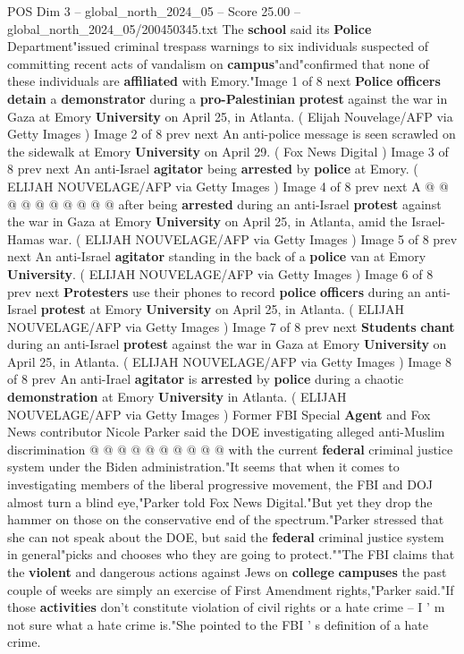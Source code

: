 \begin{textsample}{POS Dim 3 – global\_north\_2024\_05 – Score 25.00 – global\_north\_2024\_05/200450345.txt}
The \textbf{school} said its \textbf{Police} Department"issued criminal trespass warnings to six individuals suspected of committing recent acts of vandalism on \textbf{campus}"and"confirmed that none of these individuals are \textbf{affiliated} with Emory."Image 1 of 8 next \textbf{Police} \textbf{officers} \textbf{detain} a \textbf{demonstrator} during a \textbf{pro-Palestinian} \textbf{protest} against the war in Gaza at Emory \textbf{University} on April 25, in Atlanta. ( Elijah Nouvelage/AFP via Getty Images ) Image 2 of 8 prev next An anti-police message is seen scrawled on the sidewalk at Emory \textbf{University} on April 29. ( Fox News Digital ) Image 3 of 8 prev next An anti-Israel \textbf{agitator} being \textbf{arrested} by \textbf{police} at Emory. ( ELIJAH NOUVELAGE/AFP via Getty Images ) Image 4 of 8 prev next A @ @ @ @ @ @ @ @ @ @ after being \textbf{arrested} during an anti-Israel \textbf{protest} against the war in Gaza at Emory \textbf{University} on April 25, in Atlanta, amid the Israel-Hamas war. ( ELIJAH NOUVELAGE/AFP via Getty Images ) Image 5 of 8 prev next An anti-Israel \textbf{agitator} standing in the back of a \textbf{police} van at Emory \textbf{University}. ( ELIJAH NOUVELAGE/AFP via Getty Images ) Image 6 of 8 prev next \textbf{Protesters} use their phones to record \textbf{police} \textbf{officers} during an anti-Israel \textbf{protest} at Emory \textbf{University} on April 25, in Atlanta. ( ELIJAH NOUVELAGE/AFP via Getty Images ) Image 7 of 8 prev next \textbf{Students} \textbf{chant} during an anti-Israel \textbf{protest} against the war in Gaza at Emory \textbf{University} on April 25, in Atlanta. ( ELIJAH NOUVELAGE/AFP via Getty Images ) Image 8 of 8 prev An anti-Irael \textbf{agitator} is \textbf{arrested} by \textbf{police} during a chaotic \textbf{demonstration} at Emory \textbf{University} in Atlanta. ( ELIJAH NOUVELAGE/AFP via Getty Images ) Former FBI Special \textbf{Agent} and Fox News contributor Nicole Parker said the DOE investigating alleged anti-Muslim discrimination @ @ @ @ @ @ @ @ @ @ with the current \textbf{federal} criminal justice system under the Biden administration."It seems that when it comes to investigating members of the liberal progressive movement, the FBI and DOJ almost turn a blind eye,"Parker told Fox News Digital."But yet they drop the hammer on those on the conservative end of the spectrum."Parker stressed that she can not speak about the DOE, but said the \textbf{federal} criminal justice system in general"picks and chooses who they are going to protect.""The FBI claims that the \textbf{violent} and dangerous actions against Jews on \textbf{college} \textbf{campuses} the past couple of weeks are simply an exercise of First Amendment rights,"Parker said."If those \textbf{activities} don't constitute violation of civil rights or a hate crime -- I ' m not sure what a hate crime is."She pointed to the FBI ' s definition of a hate crime.

\end{textsample}
